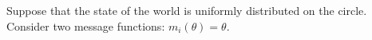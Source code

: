 \documentclass[12pt]{article}
\begin{document}
\onehalfspacing
Suppose that the state of the world is uniformly distributed on the circle. Consider two message functions: $m_{i}(\theta)=\theta$. 
\end{document}
